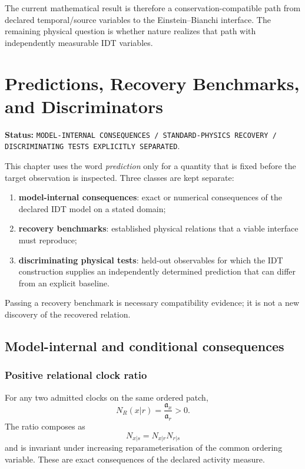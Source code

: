 The current mathematical result is therefore a conservation-compatible path from declared temporal/source variables to the Einstein--Bianchi interface. The remaining physical question is whether nature realizes that path with independently measurable IDT variables.


\chapter{Predictions, Recovery Benchmarks, and Discriminators}

\noindent\textbf{Status:} \texttt{MODEL-INTERNAL CONSEQUENCES / STANDARD-PHYSICS RECOVERY / DISCRIMINATING TESTS EXPLICITLY SEPARATED}.

This chapter uses the word \emph{prediction} only for a quantity that is fixed before the target observation is inspected. Three classes are kept separate:
\begin{enumerate}
\item \textbf{model-internal consequences}: exact or numerical consequences of the declared IDT model on a stated domain;
\item \textbf{recovery benchmarks}: established physical relations that a viable interface must reproduce;
\item \textbf{discriminating physical tests}: held-out observables for which the IDT construction supplies an independently determined prediction that can differ from an explicit baseline.
\end{enumerate}
Passing a recovery benchmark is necessary compatibility evidence; it is not a new discovery of the recovered relation.

\section{Model-internal and conditional consequences}

\subsection{Positive relational clock ratio}

For any two admitted clocks on the same ordered patch,
\[
\boxed{
N_R(x|r)=\frac{\mathfrak a_x}{\mathfrak a_r}>0.
}
\]
The ratio composes as
\[
N_{x|s}=N_{x|r}N_{r|s}
\]
and is invariant under increasing reparameterisation of the common ordering variable. These are exact consequences of the declared activity measure.

